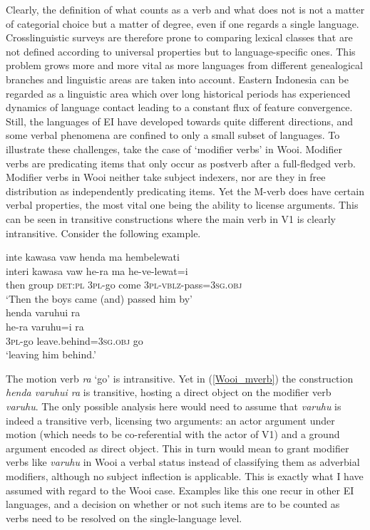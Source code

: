 Clearly, the definition of what counts as a verb and what does not is not a matter of categorial choice but a matter of degree, even if one regards a single language. Crosslinguistic surveys are therefore prone to comparing lexical classes that are not defined according to universal properties but to language-specific ones. This problem grows more and more vital as more languages from different genealogical branches and linguistic areas are taken into account. Eastern Indonesia can be regarded as a linguistic area which over long historical periods has experienced dynamics of language contact leading to a constant flux of feature convergence. Still, the languages of EI have developed towards quite different directions, and some verbal phenomena are confined to only a small subset of languages. To illustrate these challenges, take the case of `modifier verbs' in Wooi. Modifier verbs are predicating items that only occur as postverb after a full-fledged verb. Modifier verbs in Wooi neither take subject indexers, nor are they in free distribution as independently predicating items. Yet the M-verb does have certain verbal properties, the most vital one being the ability to license arguments. This can be seen in transitive constructions where the main verb in V1 is clearly intransitive. Consider the following example.

\ea 
{}
\ea
\glll inte kawasa vaw henda ma hembelewati \\
interi kawasa vaw he-ra ma he-ve-lewat=i \\
then group \textsc{det}:\textsc{pl} \textsc{3}\textsc{pl}-go come \textsc{3}\textsc{pl}-\textsc{vblz}-pass=\textsc{3}\textsc{sg}.\textsc{obj} \\
\glft `Then the boys came (and) passed him by' \\ 
\ex \label{Wooi_mverb}
\glll henda varuhui ra \\ 
he-ra varuhu=i ra \\
\textsc{3}\textsc{pl}-go leave.behind=\textsc{3}\textsc{sg}.\textsc{obj} go \\
\glft `leaving him behind.'\\ 
\z
\z

The motion verb \textit{ra} `go' is intransitive. Yet in (\ref{Wooi_mverb}) the construction \textit{henda varuhui ra} is transitive, hosting a direct object on the modifier verb \textit{varuhu}. The only possible analysis here would need to assume that \textit{varuhu} is indeed a transitive verb, licensing two arguments: an actor argument under motion (which needs to be co-referential with the actor of V1) and a ground argument encoded as direct object. This in turn would mean to grant modifier verbs like \textit{varuhu} in Wooi a verbal status instead of classifying them as adverbial modifiers, although no subject inflection is applicable. This is exactly what I have assumed with regard to the Wooi case. Examples like this one recur in other EI languages, and a decision on whether or not such items are to be counted as verbs need to be resolved on the single-language level.

